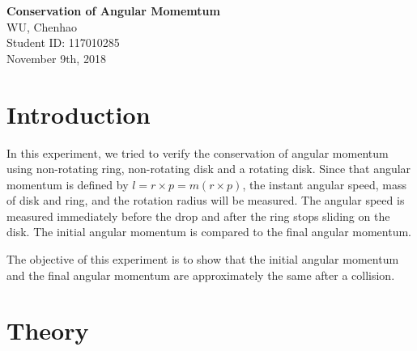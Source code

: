 \documentclass[12pt]{article}
\begin{document}
	\begin{titlepage}
		\begin{center}
			\Large\textbf{Conservation of Angular Momemtum}\\
			\Large\textmd{WU, Chenhao}\\
			\Large\textmd{Student ID: 117010285}\\
			\Large\textmd{November 9th, 2018}\\
		\end{center}
	\end{titlepage}

	\section{Introduction}
	In this experiment, we tried to verify the conservation of angular momentum using non-rotating ring, non-rotating disk and a rotating disk. Since that angular momentum is defined by $l = r \times p = m(r \times p)$, the instant angular speed, mass of disk and ring, and the rotation radius will be measured. The angular speed is measured immediately before the drop and after the ring stops sliding on the disk. The initial angular momentum is compared to the final angular momentum.\par
	The objective of this experiment is to show that the initial angular momentum and the final angular momentum are approximately the same after a collision. \par 
	
	\section{Theory}
\end{document}
